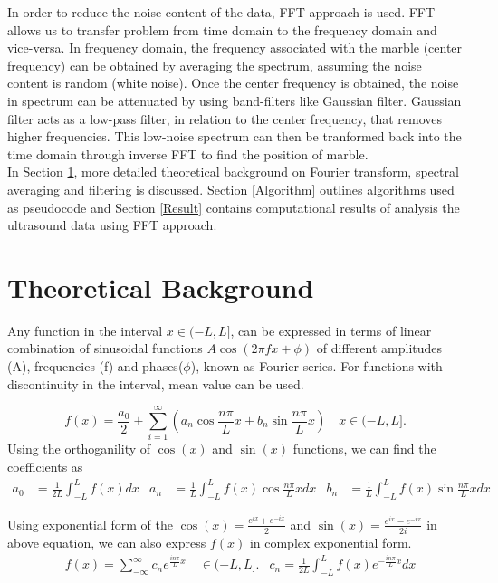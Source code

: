 \documentclass{article}
\begin{document}
In order to reduce the noise content of the data, FFT approach is used. FFT allows us to transfer problem from time domain to the frequency domain and vice-versa. In frequency domain, the frequency associated with the marble (center frequency) can be obtained by averaging the spectrum, assuming the noise content is random (white noise). Once the center frequency is obtained, the noise in spectrum can be attenuated by using band-filters like Gaussian filter. Gaussian filter acts as a low-pass filter, in relation to the center frequency, that removes higher frequencies. This low-noise spectrum can then be tranformed back into the  time domain through inverse FFT to find the position of marble. \\
In Section \ref{Introduction}, more detailed theoretical background on Fourier transform, spectral averaging and filtering is discussed. Section \ref{Algorithm} outlines algorithms used as pseudocode and Section \ref{Result} contains computational results  of analysis the ultrasound data using FFT approach.

\pagebreak
\section{Theoretical Background}\label{Introduction}
Any function in the interval $x \in (-L, L]$, can be expressed in terms of linear combination of sinusoidal functions $A \cos(2 \pi fx + \phi)$ of different amplitudes (A), frequencies (f) and phases($\phi$), known as Fourier series. For functions with discontinuity in the interval, mean value can be used. 

\begin{equation}\label{eqn:fourierseries}
    f(x) = \frac{a_0}{2} + \sum_{i=1}^\infty \left(a_n\cos{\frac{n \pi}{L}x} + b_n\sin{\frac{n \pi}{L}x}\right) \quad x \in (-L,L].
\end{equation}
Using the orthoganility of $\cos(x)$ and $\sin(x)$ functions, we can find the coefficients as
\begin{align*}
a_0 &= \frac{1}{2L}\int_{-L}^{L} f(x) dx 
&a_n &= \frac{1}{L}\int_{-L}^{L} f(x) \cos{\frac{n \pi}{L}}x dx 
&b_n &= \frac{1}{L}\int_{-L}^{L} f(x) \sin{\frac{n \pi}{L}x}dx 
\end{align*}

Using exponential form of the $\cos(x) = \frac{e^{ix} + e^{-ix}}{2}$ and $\sin(x) = \frac{e^{ix} - e^{-ix}}{2i}$ in above equation, we can also express $f(x)$ in complex exponential form.
\begin{align*}
&f(x) = \sum_{-\infty}^{\infty} c_n e^{\frac{in \pi}{L}x}  \quad \in (-L,L]. 
&c_n = \frac{1}{2L}\int_{-L}^{L} f(x) e^{-\frac{in \pi}{L}x} dx
\end{align*}
\end{document}
